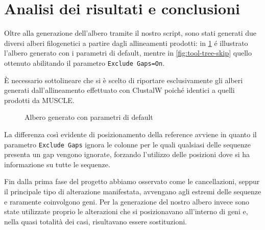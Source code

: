 \documentclass[11pt,italian]{article}
\begin{document}
\newpage
\section{Analisi dei risultati e conclusioni}
Oltre alla generazione dell'albero tramite il nostro script, sono stati generati due diversi alberi filogenetici a partire dagli allineamenti prodotti: in \cref{fig:tool-tree} é illustrato l'albero generato con i parametri di default, mentre in \cref{fig:tool-tree-skip} quello ottenuto abilitando il parametro \lstinline{Exclude Gaps=On}.

È necessario sottolineare che si è scelto di riportare esclusivamente gli alberi generati dall'allineamento effettuato con ClustalW poiché identici a quelli prodotti da MUSCLE.

\begin{figure}[H]
  \caption{Albero generato con parametri di default}
  \label{fig:tool-tree}
\end{figure}

La differenza così evidente di posizionamento della reference avviene in quanto il parametro \lstinline{Exclude Gaps} ignora le colonne per le quali qualsiasi delle sequenze presenta un gap vengono ignorate, forzando l'utilizzo delle posizioni dove si ha informazione su tutte le sequenze.

Fin dalla prima fase del progetto abbiamo osservato come le cancellazioni, seppur il principale tipo di alterazione manifestata, avvengano agli estremi delle sequenze e raramente coinvolgono geni. Per la generazione del nostro albero invece sono state utilizzate proprio le alterazioni che si posizionavano all'interno di geni e, nella quasi totalità dei casi, risultavano essere sostituzioni.
\end{document}
